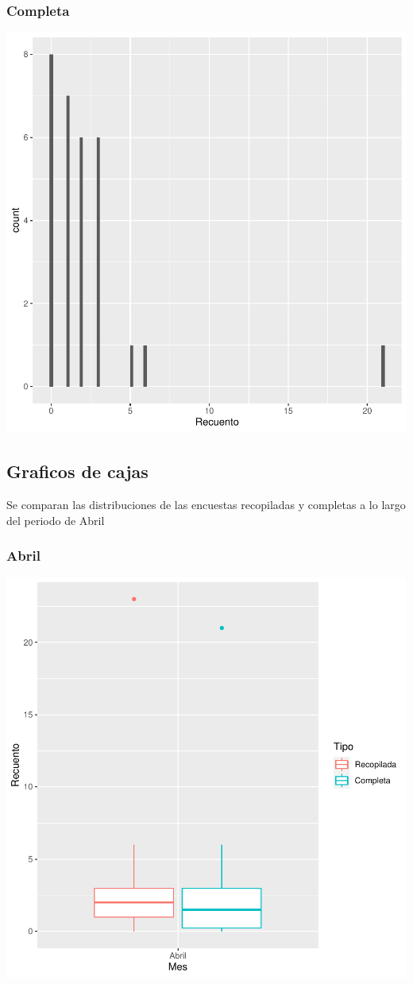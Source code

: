 \documentclass{article}
\begin{document}
\subsubsection{Completa}

\includegraphics{seguimento2-072}

\subsection{Graficos de cajas}
Se comparan las distribuciones de las encuestas recopiladas y completas a lo largo del periodo de Abril

\subsubsection{Abril}

\includegraphics{seguimento2-073}
\end{document}
